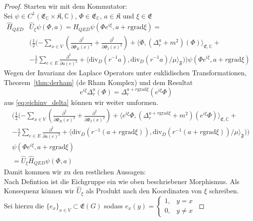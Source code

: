 \documentclass[11pt,a4paper,leqno]{report}
\numberwithin{equation}{chapter}
\begin{document}
\begin{proof}
Starten wir mit dem Kommutator:\\
Sei $\psi\in C^1(\mathfrak{E}_\mathbb{C}\times\mathfrak{K},\mathbb{C})$, $\Phi\in \mathfrak{E}_\mathbb{C}$, $a\in \mathfrak{K}$ und $\xi\in \mathfrak{E}$
\begin{align*}
	\hat{H}_{QED}&\hat{U}_\xi\psi(\Phi, a)= \hat{H}_{QED}\psi(\Phi e^{i\xi}, a + r \text{grad}\xi)=\\&(\frac{1}{2}(-\sum_{x\in V}(\frac{\partial^2}{\partial\Phi_R(x)^2} +\frac{\partial^2}{\partial\Phi_I(x)^2})+\langle \Phi, (\Delta_r^a + m^2)(\Phi)\rangle_{\mathfrak{E},\mathbb{C}}+\\ &-\frac{1}{\epsilon}\sum_{e\in E}\frac{\partial^2}{\partial a(e)^2} + \langle \text{div}_D(r^{-1}a), \text{div}_D(r^{-1}a)/\mu\rangle_{\mathfrak{F}}))\psi(\Phi e^{i\xi}, a + r \text{grad}\xi)
\end{align*}
Wegen der Invarianz des Laplace Operators unter euklidischen Transformationen, Theorem~\ref{thm:derham} (de Rham Komplex) und dem Resultat
\begin{equation}
	e^{i\xi}\Delta_r^a(\Phi) = \Delta_r^{a + r\text{grad}\xi}(e^{i\xi}\Phi)
\end{equation}
aus \eqref{eq:eichinv_delta} k\"onnen wir weiter umformen.
\begin{align*}
	&(\frac{1}{2}(-\sum_{x\in V}(\frac{\partial^2}{\partial\Phi_R(x)^2} +\frac{\partial^2}{\partial\Phi_I(x)^2})+\langle e^{i\xi}\Phi, (\Delta_r^{a+r\text{grad}\xi} + m^2)(e^{i\xi}\Phi)\rangle_{\mathfrak{E},\mathbb{C}}+\\ &-\frac{1}{\epsilon}\sum_{e\in E}\frac{\partial^2}{\partial a(e)^2} + \langle \text{div}_D(r^{-1}(a+r\text{grad}\xi)), \text{div}_D(r^{-1}(a+r\text{grad}\xi))/\mu\rangle_{\mathfrak{F}}))\\&\psi(\Phi e^{i\xi}, a + r \text{grad}\xi)\\
	&=\hat{U}_\xi\hat{H}_{QED}\psi(\Phi, a)
\end{align*}
Damit kommen wir zu den restlichen Aussagen:\\
Nach Defintion ist die Eichgruppe ein wie oben beschriebener Morphismus. Als Konsequenz k\"onnen wir $\hat{U}_\xi$ als Produkt nach den Koordinaten von $\xi$ schreiben.\\
Sei hierzu die $\{e_x\}_{x\in V}\subset\mathfrak{E}(G)$ sodass $e_x(y)=\begin{cases} 1, & y=x \\
								0, & y\neq x
				\end{cases}$

\end{proof}
\end{document}
